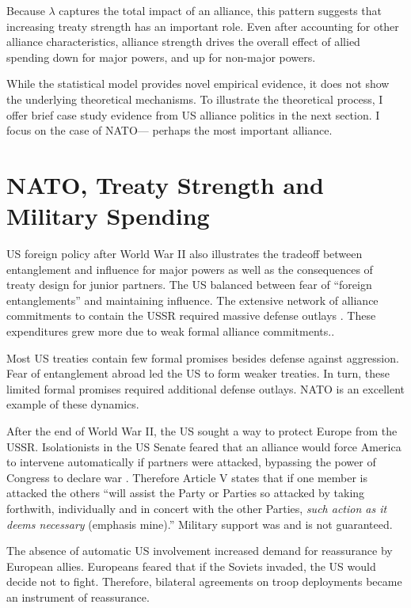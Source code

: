 \documentclass[12pt]{article}
\begin{document}
Because $\lambda$ captures the total impact of an alliance, this pattern suggests that increasing treaty strength has an important role. 
Even after accounting for other alliance characteristics, alliance strength drives the overall effect of allied spending down for major powers, and up for non-major powers. 


While the statistical model provides novel empirical evidence, it does not show the underlying theoretical mechanisms. 
To illustrate the theoretical process, I offer brief case study evidence from US alliance politics in the next section.  
I focus on the case of NATO--- perhaps the most important alliance. 


\section{NATO, Treaty Strength and Military Spending}


US foreign policy after World War II also illustrates the tradeoff between entanglement and influence for major powers as well as the consequences of treaty design for junior partners. 
The US balanced between fear of ``foreign entanglements'' and maintaining influence. 
The extensive network of alliance commitments to contain the USSR required massive defense outlays \citep{Fordham1998}. 
These expenditures grew more due to weak formal alliance commitments.. 


Most US treaties contain few formal promises besides defense against aggression. 
Fear of entanglement abroad led the US to form weaker treaties.
In turn, these limited formal promises required additional defense outlays.  
NATO is an excellent example of these dynamics. 


After the end of World War II, the US sought a way to protect Europe from the USSR. 
Isolationists in the US Senate feared that an alliance would force America to intervene automatically if partners were attacked, bypassing the power of Congress to declare war \citep[pg. 280-1]{Acheson1969}.
Therefore Article V states that if one member is attacked the others ``will assist the Party or Parties so attacked by taking forthwith, individually and in concert with the other Parties, \emph{such action as it deems necessary} (emphasis mine).'' 
Military support was and is not guaranteed. 


The absence of automatic US involvement increased demand for reassurance by European allies. 
Europeans feared that if the Soviets invaded, the US would decide not to fight. 
Therefore, bilateral agreements on troop deployments became an instrument of reassurance. 
\end{document}

